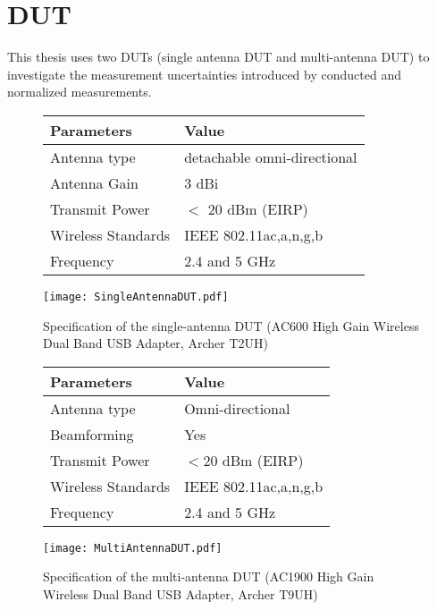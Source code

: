 \section{\ac{DUT}}
This thesis uses two DUTs (single antenna DUT and multi-antenna DUT) to investigate the measurement uncertainties introduced by conducted and normalized measurements. 

\begin{figure}[h]
    \begin{minipage}[c]{.7\textwidth}%
        \begin {tabular} {|l|l|} 
\toprule
Parameters & Value \\ 
\midrule 
Antenna type & detachable omni-directional \\
Antenna Gain & 3 dBi \\
Transmit Power & $<$ 20 dBm (\acs{EIRP})\\ 
Wireless Standards & \acs{IEEE} 802.11ac,a,n,g,b \\
Frequency & 2.4 and 5 GHz \\
\bottomrule
\end {tabular}    \end{minipage}
    \hfill
    \begin{minipage}[c]{.2\textwidth}
        \texttt{[image: SingleAntennaDUT.pdf]}
    \end{minipage}
    \caption{Specification of the single-antenna \acs{DUT} (AC600 High Gain Wireless Dual Band USB Adapter, Archer T2UH)}
\label{fig:singleAntennaDUT}
\end{figure}     

\begin{figure}[h]
    \begin{minipage}[c]{.7\textwidth}%
        \begin {tabular} {|l|l|} 
\toprule
Parameters & Value \\ 
\midrule 
Antenna type & Omni-directional \\
Beamforming & Yes \\
Transmit Power &  $<$20 dBm (\acs{EIRP})\\ 
Wireless Standards & \acs{IEEE} 802.11ac,a,n,g,b \\
Frequency & 2.4 and 5 GHz \\
\bottomrule
\end {tabular}    \end{minipage}
    \hfill
    \begin{minipage}[c]{.2\textwidth}
        \texttt{[image: MultiAntennaDUT.pdf]}
    \end{minipage}
    \caption{Specification of the multi-antenna \acs{DUT} (AC1900 High Gain Wireless Dual Band USB Adapter, Archer T9UH)}
\label{fig:multiAntennaDUT}
\end{figure}     
